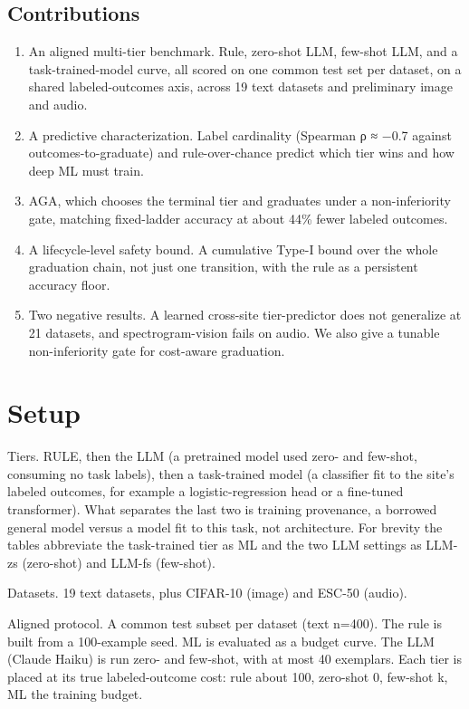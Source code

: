 \subsection{Contributions}\label{contributions}

\begin{enumerate}
\def\labelenumi{\arabic{enumi}.}
\tightlist
\item
  An aligned multi-tier benchmark. Rule, zero-shot LLM, few-shot LLM,
  and a task-trained-model curve, all scored on one common test set per
  dataset, on a shared labeled-outcomes axis, across 19 text datasets
  and preliminary image and audio.
\item
  A predictive characterization. Label cardinality (Spearman ρ ≈ −0.7
  against outcomes-to-graduate) and rule-over-chance predict which tier
  wins and how deep ML must train.
\item
  AGA, which chooses the terminal tier and graduates under a
  non-inferiority gate, matching fixed-ladder accuracy at about 44\%
  fewer labeled outcomes.
\item
  A lifecycle-level safety bound. A cumulative Type-I bound over the
  whole graduation chain, not just one transition, with the rule as a
  persistent accuracy floor.
\item
  Two negative results. A learned cross-site tier-predictor does not
  generalize at 21 datasets, and spectrogram-vision fails on audio. We
  also give a tunable non-inferiority gate for cost-aware graduation.
\end{enumerate}

\section{Setup}\label{setup}

Tiers. RULE, then the LLM (a pretrained model used zero- and few-shot,
consuming no task labels), then a task-trained model (a classifier fit
to the site's labeled outcomes, for example a logistic-regression head
or a fine-tuned transformer). What separates the last two is training
provenance, a borrowed general model versus a model fit to this task,
not architecture. For brevity the tables abbreviate the task-trained
tier as ML and the two LLM settings as LLM-zs (zero-shot) and LLM-fs
(few-shot).

Datasets. 19 text datasets, plus CIFAR-10 (image) and ESC-50 (audio).

Aligned protocol. A common test subset per dataset (text n=400). The
rule is built from a 100-example seed. ML is evaluated as a budget
curve. The LLM (Claude Haiku) is run zero- and few-shot, with at most 40
exemplars. Each tier is placed at its true labeled-outcome cost: rule
about 100, zero-shot 0, few-shot k, ML the training budget.

